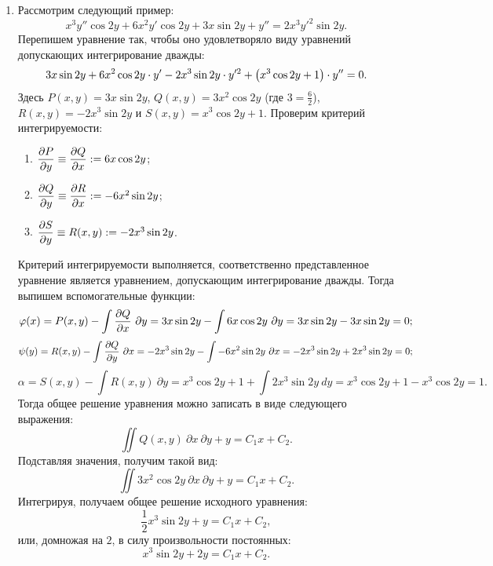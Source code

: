 		\begin{enumerate}

			\item Рассмотрим следующий пример:
				\[ x^3 y'' \cos{2y} + 6 x^2 y' \cos{2y} + 3x \sin{2y} + y'' = 2 x^3 y'^2 \sin{2y}. \]
				Перепишем уравнение так, чтобы оно удовлетворяло виду уравнений допускающих интегрирование дважды:
				\[ 3x \sin{2y} + 6 x^2 \cos{2y} \cdot y' - 2 x^3 \sin{2y} \cdot y'^2 + \left( x^3 \cos{2y} + 1 \right) \cdot y'' = 0. \]
				Здесь $P(x, y) = 3x \sin{2y}$, $Q(x, y) = 3x^2 \cos{2y}$ (где $3 = \frac{6}{2}$), $R(x, y) = -2 x^3 \sin{2y}$ и $S(x, y) = x^3 \cos{2y} + 1$. Проверим критерий интегрируемости:
				\begin{enumerate}
					\item \( \dfrac{\partial P}{\partial y} \equiv \dfrac{\partial Q}{\partial x} := 6x \cos{2y} \);
					\item \( \dfrac{\partial Q}{\partial y} \equiv \dfrac{\partial R}{\partial x} := -6x^2 \sin{2y} \);
					\item \( \dfrac{\partial S}{\partial y} \equiv R(x, y) := -2 x^3 \sin{2y} \).
				\end{enumerate}
				Критерий интегрируемости выполняется, соответственно представленное уравнение является уравнением, допускающим интегрирование дважды. Тогда выпишем вспомогательные функции:
				\[ \varphi(x) = P(x, y) - \int \dfrac{\partial Q}{\partial x} ~ \partial y = 3x \sin{2y} - \int 6x \cos{2y} ~ \partial y = 3x \sin{2y} - 3x \sin{2y} = 0; \]
				\[ \psi(y) = R(x, y) - \int \dfrac{\partial Q}{\partial y} ~ \partial x = -2 x^3 \sin{2y} - \int -6x^2 \sin{2y} ~ \partial x = -2 x^3 \sin{2y} + 2 x^3 \sin{2y} = 0; \]
				\[ \alpha = S(x, y) - \int R(x, y) ~ \partial y = x^3 \cos{2y} + 1 + \int 2 x^3 \sin{2y} ~ dy = x^3 \cos{2y} + 1 - x^3 \cos{2y} = 1. \]
				Тогда общее решение уравнения можно записать в виде следующего выражения:
				\[ \iint Q(x, y) ~ \partial x ~ \partial y + y = C_1 x + C_2. \]
				Подставляя значения, получим такой вид:
				\[ \iint 3x^2 \cos{2y} ~ \partial x ~ \partial y + y = C_1 x + C_2. \]
				Интегрируя, получаем общее решение исходного уравнения:
				\[ \frac{1}{2} x^3 \sin{2y} + y = C_1 x + C_2, \]
				или, домножая на $2$, в силу произвольности постоянных:
				\[ x^3 \sin{2y} + 2y = C_1 x + C_2. \]


\end{enumerate}
